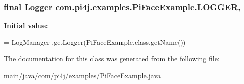 \subsubsection[{L\+O\+G\+G\+E\+R}]{\setlength{\rightskip}{0pt plus 5cm}final Logger com.\+pi4j.\+examples.\+Pi\+Face\+Example.\+L\+O\+G\+G\+E\+R\hspace{0.3cm}{\ttfamily [static]}, {\ttfamily [private]}}\label{classcom_1_1pi4j_1_1examples_1_1PiFaceExample_a2cb21260299dce63698aebd5f3c7d69f}
{\bfseries Initial value\+:}
\begin{DoxyCode}
= LogManager
            .getLogger(PiFaceExample.class.getName())
\end{DoxyCode}


The documentation for this class was generated from the following file\+:\begin{DoxyCompactItemize}
\item 
main/java/com/pi4j/examples/\hyperlink{PiFaceExample_8java}{Pi\+Face\+Example.\+java}\end{DoxyCompactItemize}
